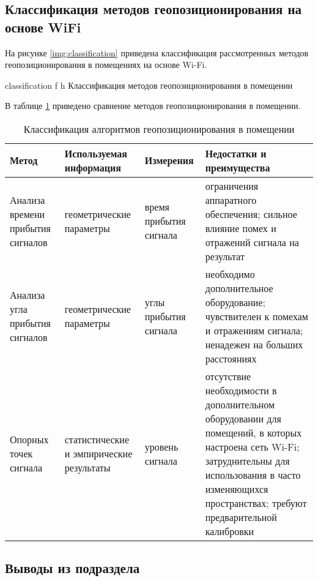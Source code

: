 
\clearpage

\subsection{Классификация методов геопозиционирования на основе WiFi}

На рисунке \ref{img:classification} приведена классификация рассмотренных методов геопозиционирования в помещениях на основе Wi-Fi.

    {classification}
    {f}
    {h}
    {\linewidth}
    {Классификация методов геопозиционирования в помещении}

\clearpage

В таблице \ref{table:classification} приведено сравнение методов геопозиционирования в помещении.

\begin{table}[ht]
    \caption{Классификация алгоритмов геопозиционирования в помещении}
    \begin{tabular}{|m{3cm}|m{3.5cm}|m{3cm}|m{5.5cm}|}
        \hline
        Метод & Используемая информация & Измерения & Недостатки и преимущества \\
        \hline
        \hline
        Анализа времени прибытия сигналов & геометрические параметры & время прибытия сигнала & ограничения аппаратного обеспечения; сильное влияние помех и отражений сигнала на результат \\
        \hline
        Анализа угла прибытия сигналов & геометрические параметры & углы прибытия сигнала & необходимо дополнительное оборудование; чувствителен к помехам и отражениям сигнала; ненадежен на больших расстояниях \\
        \hline
        Опорных точек сигнала & статистические и эмпирические результаты & уровень сигнала & отсутствие необходимости в дополнительном оборудовании для помещений, в которых настроена сеть Wi-Fi; затруднительны для использования в часто изменяющихся пространствах; требуют предварительной калибровки \\
        \hline
    \end{tabular}
    \label{table:classification}
\end{table}

\subsection*{Выводы из подраздела}

